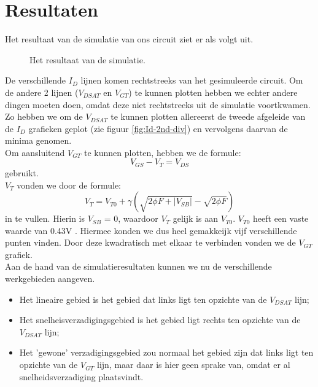 \documentclass{scrartcl}  %
\begin{document}
\section{Resultaten}
Het resultaat van de simulatie van ons circuit ziet er als volgt uit.
\begin{figure}[H]
\centering
	\setlength{} 
	\setlength{}
	
	\caption{Het resultaat van de simulatie.}
	\label{fig:Id}
\end{figure}
De verschillende $I_{D}$ lijnen komen rechtstreeks van het gesimuleerde circuit. 
Om de andere 2 lijnen ($V_{DSAT}$ en $V_{GT}$) te kunnen plotten hebben we echter andere dingen moeten doen, omdat deze niet rechtstreeks uit de simulatie voortkwamen. 
Zo hebben we om de $V_{DSAT}$ te kunnen plotten allereerst de tweede afgeleide van de $I_{D}$ grafieken geplot (zie figuur \ref{fig:Id-2nd-div}) en vervolgens daarvan de minima genomen. 
\\
Om aansluitend $V_{GT}$ te kunnen plotten, hebben we de formule: 
\begin{equation}
V_{GS} - V_{T} = V_{DS} 
\end{equation} gebruikt.\\
$V_{T}$ vonden we door de formule: 
\begin{equation}
V_{T} = V_{T0} + \gamma (\sqrt {2 \phi F + |V_{SB}|} - \sqrt{ 2 \phi F} ) 
\end{equation} in te vullen. 
Hierin is $V_{SB}$ = 0, waardoor $V_{T}$  gelijk is aan $V_{T0}$. 
$V_{T0}$ heeft een vaste waarde van 0.43V \cite[103]{rabaey-integrated-circuits}. 
Hiermee konden we dus heel gemakkeijk vijf verschillende punten vinden. 
Door deze kwadratisch met elkaar te verbinden vonden we de $V_{GT}$ grafiek. 
\\
Aan de hand van de simulatieresultaten kunnen we nu de verschillende werkgebieden aangeven.
\begin{itemize}
	\item Het lineaire gebied is het gebied dat links ligt ten opzichte van de $V_{DSAT}$ lijn;
	\item Het snelheisverzadigingsgebied is het gebied ligt rechts ten opzichte van de $V_{DSAT}$ lijn;
	\item Het 'gewone' verzadigingsgebied zou normaal het gebied zijn dat links ligt ten opzichte van de $V_{GT}$ lijn, maar daar is hier geen sprake van, omdat er al snelheidsverzadiging plaatsvindt.
\end{itemize}
\end{document}
